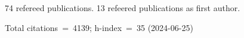 74 refereed publications. 13 refeered publications as first author.

Total citations~=~4139; h-index~=~35 (2024-06-25)